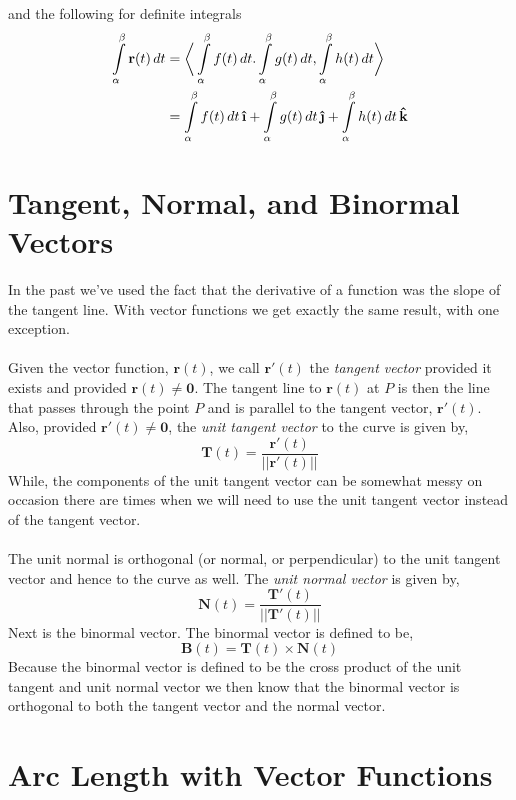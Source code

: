 \documentclass[10pt,reqno]{book}
\theoremstyle{definition}
\renewcommand{\vec}[1]{\mathbf{#1}}
\newcommand{\uvec}[1]{\boldsymbol{\hat{\textbf{#1}}}}
\begin{document}
	and the following for definite integrals
	\begin{align*}
		\int\limits_{\alpha}^{\beta} \vec{r}(t)\,dt &= \bigg\langle \int\limits_{\alpha}^{\beta} f(t)\,dt. \int\limits_{\alpha}^{\beta} g(t)\,dt, \int\limits_{\alpha}^{\beta} h(t)\,dt \bigg\rangle\\
		&= \int\limits_{\alpha}^{\beta} f(t)\,dt\,\uvec{\i} + \int\limits_{\alpha}^{\beta} g(t)\,dt\,\uvec{\j} + \int\limits_{\alpha}^{\beta} h(t)\,dt\,\uvec{k}
	\end{align*}
	
	\section{Tangent, Normal, and Binormal Vectors}
	
	In the past we've used the fact that the derivative of a function was the slope of the tangent line.  With vector functions we get exactly the same result, with one exception.\\ \\
	Given the vector function, $ \vec{r}(t) $, we call $ \vec{r}'(t) $ the \textit{tangent vector} provided it exists and provided $ \vec{r}(t) \neq \vec{0} $. The tangent line to $ \vec{r}(t) $ at $ P $ is then the line that passes through the point $ P $ and is parallel to the tangent vector, $ \vec{r}'(t) $. Also, provided $ \vec{r}'(t) \neq \vec{0} $, the \textit{unit tangent vector} to the curve is given by,
	\[ \vec{T}(t) = \frac{\vec{r}'(t)}{|| \vec{r}'(t) ||} \]
	While, the components of the unit tangent vector can be somewhat messy on occasion there are times when we will need to use the unit tangent vector instead of the tangent vector.\\ \\
	The unit normal is orthogonal (or normal, or perpendicular) to the unit tangent vector and hence to the curve as well. The \textit{unit normal vector} is given by,
	\[ \vec{N}(t) = \frac{\vec{T}'(t)}{|| \vec{T}'(t) ||} \]
	Next is the binormal vector. The binormal vector is defined to be,
	\[ \vec{B}(t) = \vec{T}(t) \times \vec{N}(t) \]
	Because the binormal vector is defined to be the cross product of the unit tangent and unit normal vector we then know that the binormal vector is orthogonal to both the tangent vector and the normal vector.
	
	\section{Arc Length with Vector Functions}
	
\end{document}
